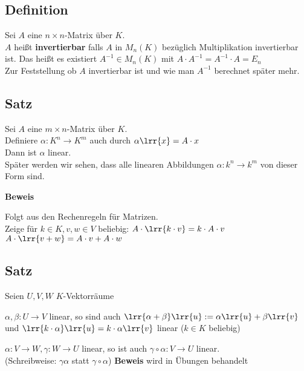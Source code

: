 \subsection{Definition}
	Sei $A$ eine $n\times n$-Matrix über $K$.\\
	$A$ heißt \textbf{invertierbar} falls $A$ in $M_n(K)$ bezüglich Multiplikation invertierbar ist. Das heißt es existiert $A^{-1}\in M_n(K)$ mit $A\cdot A^{-1}=A^{-1}\cdot A=E_n$ \\
	Zur Feststellung ob $A$ invertierbar ist und wie man $A^{-1}$ berechnet später mehr.
	
\subsection{Satz}
	Sei $A$ eine $m\times n$-Matrix über $K$.\\
	Definiere $\alpha:K^n\rightarrow K^m$ auch durch $\alpha\lrr{x}=A\cdot x$\\
	Dann ist $\alpha$ linear.\\
	Später werden wir sehen, dass alle linearen Abbildungen $\alpha:k^n\rightarrow k^m$ von dieser Form sind.
	
	\textbf{Beweis}
	
	Folgt aus den Rechenregeln für Matrizen.\\
	Zeige für $k\in K, v,w\in V$ beliebig: $A\cdot\lrr{k\cdot v}=k\cdot A\cdot v$\\
	$A\cdot\lrr{v+w}=A\cdot v+A\cdot w$
	
\subsection{Satz}
	Seien $U,V,W$ $K$-Vektorräume
		\item $\alpha,\beta:U\rightarrow V$ linear, so sind auch $\lrr{\alpha+\beta}\lrr{u}:=\alpha\lrr{u}+\beta\lrr{v}$ und $\lrr{k\cdot\alpha}\lrr{u}=k\cdot\alpha\lrr{v}$ linear ($k\in K$ beliebig)
		\item $\alpha:V\rightarrow W,\gamma:W\rightarrow U$ linear, so ist auch $\gamma\circ\alpha:V\rightarrow U$ linear.\\
			(Schreibweise: $\gamma\alpha$ statt $\gamma\circ\alpha$)
	\subExEnd
	\textbf{Beweis} wird in Übungen behandelt
	
